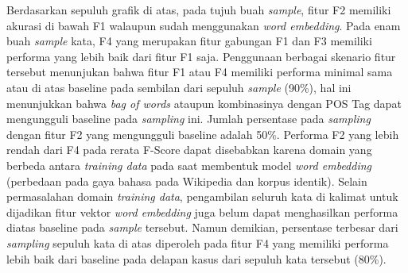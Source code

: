 Berdasarkan sepuluh grafik di atas, pada tujuh buah \textit{sample}, fitur F2 memiliki akurasi di bawah F1 walaupun sudah menggunakan \textit{word embedding}. Pada enam buah \textit{sample} kata, F4 yang merupakan fitur gabungan F1 dan F3 memiliki performa yang lebih baik dari fitur F1 saja. Penggunaan berbagai skenario fitur tersebut menunjukan bahwa fitur F1 atau F4 memiliki performa minimal sama atau di atas baseline pada sembilan dari sepuluh \textit{sample} (90\%), hal ini menunjukkan bahwa \textit{bag of words} ataupun kombinasinya dengan POS Tag dapat mengungguli baseline pada \textit{sampling} ini. Jumlah persentase pada \textit{sampling} dengan fitur F2 yang mengungguli baseline adalah 50\%. Performa F2 yang lebih rendah dari F4 pada rerata F-Score dapat disebabkan karena domain yang berbeda antara \textit{training data} pada saat membentuk model \textit{word embedding} (perbedaan pada gaya bahasa pada Wikipedia dan korpus identik). Selain permasalahan domain \textit{training data}, pengambilan seluruh kata di kalimat untuk dijadikan fitur vektor \textit{word embedding} juga belum dapat menghasilkan performa diatas baseline pada \textit{sample} tersebut. Namun demikian, persentase terbesar dari \textit{sampling} sepuluh kata di atas diperoleh pada fitur F4 yang memiliki performa lebih baik dari baseline pada delapan kasus dari sepuluh kata tersebut (80\%).